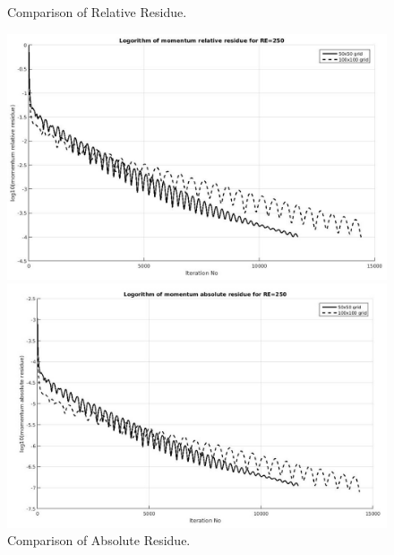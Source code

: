 \documentclass[12pt]{elsarticle}
\begin{document}
	\begin{figure}[h]
		\caption{Comparison of Relative Residue.}
		\centering\includegraphics[width=1.0\linewidth]{31_rr_mesh_re_250_comparision}
		\caption{Comparison of Absolute Residue.}
		\centering\includegraphics[width=1.0\linewidth]{32_ar_mesh_re_250_comparision}
	\end{figure}
	
\end{document}
